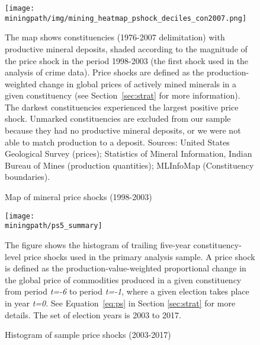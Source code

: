\newpage
\begin{figure}[H]\caption{Map of mineral price shocks (1998-2003)}
  \begin{center}
    \hspace*{-0.9in}
    \texttt{[image: \\miningpath/img/mining\_heatmap\_pshock\_deciles\_con2007.png]} 
    \label{fig:shock_map}
  \end{center}
  \footnotesize{The map shows constituencies (1976-2007
    delimitation) with productive mineral deposits, shaded
    according to the magnitude of the price shock in the period
    1998-2003 (the first shock used in the analysis of crime
    data). Price shocks are defined as the production-weighted
    change in global prices of actively mined minerals in a given
    constituency (see Section~\ref{sec:strat} for more
    information).  The darkest constituencies experienced the
    largest positive price shock.  Unmarked constituencies are
    excluded from our sample because they had no productive mineral
    deposits, or we were not able to match production to a
    deposit. Sources: United States Geological Survey (prices);
    Statistics of Mineral Information, Indian Bureau of Mines
    (production quantities); MLInfoMap (Constituency boundaries).}
\end{figure}

\newpage
\begin{figure}[H]\caption{Histogram of sample price shocks (2003-2017)}
  \begin{center}
    \hspace*{-0.9in}
    \texttt{[image: \\miningpath/ps5\_summary]} 
    \label{fig:ps5_hist}
  \end{center}
  \footnotesize{The figure shows the histogram of trailing five-year
    constituency-level price shocks used in the primary analysis
    sample. A price shock is defined as the
    production-value-weighted proportional change in the global
    price of commodities produced in a given constituency from
    period \textit{t=-6} to period \textit{t=-1}, where a given
    election takes place in year \textit{t=0}. See
    Equation~\ref{eq:ps} in Section \ref{sec:strat} for more
    details. The set of election years is 2003 to 2017.}
\end{figure}
